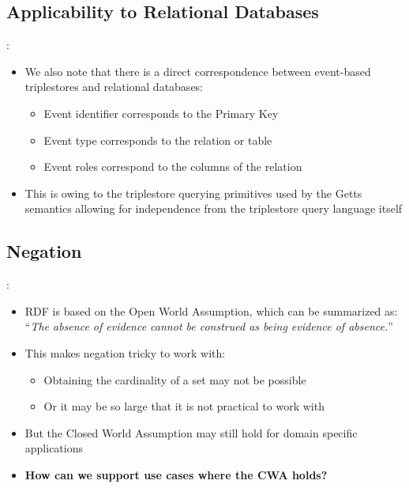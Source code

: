 \documentclass[logoontitle,tabu,supertabular,aspectratio=43]{preney-uwindsor-beamer}
\begin{document}
    \subsection{Applicability to Relational Databases}
    \begin{frame}{\insertsection: \insertsubsection}
    \begin{itemize}
        \item We also note that there is a direct correspondence between event-based triplestores and relational databases:
        \begin{itemize}
            \item Event identifier corresponds to the Primary Key
            \item Event type corresponds to the relation or table
            \item Event roles correspond to the columns of the relation
        \end{itemize}
        \item This is owing to the triplestore querying primitives used by the Getts semantics allowing for independence from the triplestore query language itself
    \end{itemize}
    \end{frame}

    \subsection{Negation}
    \begin{frame}{\insertsection: \insertsubsection}
        \begin{itemize}
            \item RDF is based on the Open World Assumption, which can be summarized as: \linebreak
            ``\textit{The absence of evidence cannot be construed as being evidence of absence.}''
            \item This makes negation tricky to work with:
            \begin{itemize}
                \item Obtaining the cardinality of a set may not be possible
                \item Or it may be so large that it is not practical to work with
            \end{itemize}
            \item But the Closed World Assumption may still hold for domain specific applications
            \item \textbf{How can we support use cases where the CWA holds?}
        \end{itemize}
    \end{frame}
\end{document}
